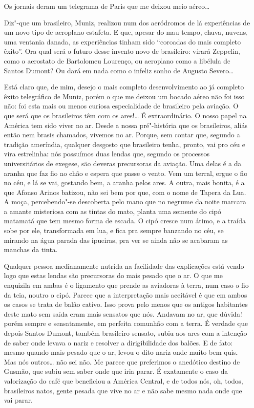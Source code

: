 Os jornais deram um telegrama de Paris que me deixou meio aéreo\ldots{}

Diz"-que um brasileiro, Muniz, realizou num dos aeródromos de lá
experiências de um novo tipo de aeroplano estafeta. E que, apesar do mau
tempo, chuva, nuvens, uma ventania danada, as experiências tinham sido
``coroadas do mais completo êxito''. Ora qual será o futuro desse
invento novo de brasileiro: virará Zeppelin, como o aerostato de
Bartolomeu Lourenço, ou aeroplano como a libélula de Santos Dumont? Ou
dará em nada como o infeliz sonho de Augusto Severo\ldots{}

Está claro que, de mim, desejo o mais completo desenvolvimento ao já
completo êxito telegráfico de Muniz, porém o que me deixou um bocado
aéreo não foi isso não: foi esta mais ou menos curiosa especialidade de
brasileiro pela aviação. O que será que os brasileiros têm com os
ares!\ldots{} É extraordinário. O nosso papel na América tem sido viver no
ar. Desde a nossa pré"-história que os brasileiros, aliás então nem
brasis chamados, vivemos no ar. Porque, sem contar que, segundo a
tradição ameríndia, qualquer desgosto que brasileiro tenha, pronto, vai
pro céu e vira estrelinha: nós possuímos duas lendas que, segundo os
processos universitários de exegese, são deveras precursoras da aviação.
Uma delas é a da aranha que faz fio no chão e espera que passe o vento.
Vem um terral, ergue o fio no céu, e lá se vai, gostando bem, a aranha
pelos ares. A outra, mais bonita, é a que Afonso Arinos batizou, não sei
bem por que, com o nome de Tapera da Lua. A moça, percebendo"-se
descoberta pelo mano que no negrume da noite marcara a amante misteriosa
com as tintas do mato, planta uma semente do cipó matamatá que tem mesmo
forma de escada. O cipó cresce num átimo, e a traída sobe por ele,
transformada em lua, e fica pra sempre banzando no céu, se mirando na
água parada das ipueiras, pra ver se ainda não se acabaram as manchas da
tinta.

Qualquer pessoa medianamente nutrida na facilidade das explicações está
vendo logo que estas lendas são precursoras do mais pesado que o ar. O
que me enquizila em ambas é o ligamento que prende as aviadoras à terra,
num caso o fio da teia, noutro o cipó. Parece que a interpretação mais
aceitável é que em ambos os casos se trata de balão cativo. Isso prova
pelo menos que os antigos habitantes deste mato sem saída eram mais
sensatos que nós. Andavam no ar, que dúvida! porém sempre e
sensatamente, em perfeita comunhão com a terra. É verdade que depois
Santos Dumont, também brasileiro sensato, subiu aos ares com a intenção
de saber onde levava o nariz e resolver a dirigibilidade dos balões. E
de fato: mesmo quando mais pesado que o ar, levou o dito nariz onde
muito bem quis. Mas nós outros\ldots{} não sei não. Me parece que preferimos
o anedótico destino de Gusmão, que subiu sem saber onde que iria parar.
É exatamente o caso da valorização do café que beneficiou a América
Central, e de todos nós, oh, todos, brasileiros natos, gente pesada que
vive no ar e não sabe mesmo nada onde que vai parar.


